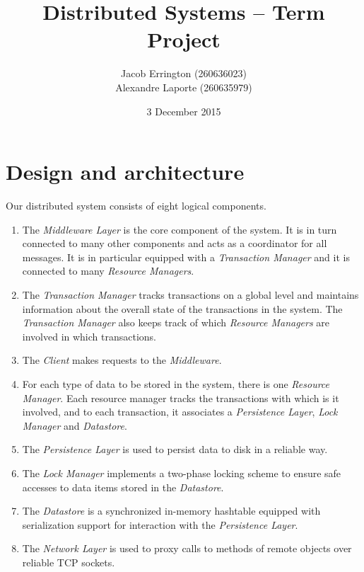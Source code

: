 \documentclass[letterpaper,11pt]{article}
\title{Distributed Systems -- Term Project}
\author{Jacob Errington (260636023) \\ Alexandre Laporte (260635979)}
\date{3 December 2015}
\begin{document}
\maketitle

\section{Design and architecture}

Our distributed system consists of eight logical components.

\begin{enumerate}
    \item
        The \emph{Middleware Layer} is the core component of the system. It is
        in turn connected to many other components and acts as a coordinator
        for all messages. It is in particular equipped with a
        \emph{Transaction Manager} and it is connected to many
        \emph{Resource Managers}.

    \item
        The \emph{Transaction Manager} tracks transactions on a global level
        and maintains information about the overall state of the transactions
        in the system.
        The \emph{Transaction Manager} also keeps track of which
        \emph{Resource Managers} are involved in which transactions.

    \item
        The \emph{Client} makes requests to the \emph{Middleware}.

    \item
        For each type of data to be stored in the system, there is one
        \emph{Resource Manager}. Each resource manager tracks the transactions
        with which is it involved, and to each transaction, it associates a
        \emph{Persistence Layer}, \emph{Lock Manager} and \emph{Datastore}.

    \item
        The \emph{Persistence Layer} is used to persist data to disk in a
        reliable way.

    \item
        The \emph{Lock Manager} implements a two-phase locking scheme to ensure
        safe accesses to data items stored in the \emph{Datastore}.

    \item
        The \emph{Datastore} is a synchronized in-memory hashtable equipped
        with serialization support for interaction with the
        \emph{Persistence Layer}.

    \item
        The \emph{Network Layer} is used to proxy calls to methods of remote
        objects over reliable TCP sockets.
\end{enumerate}
\end{document}
